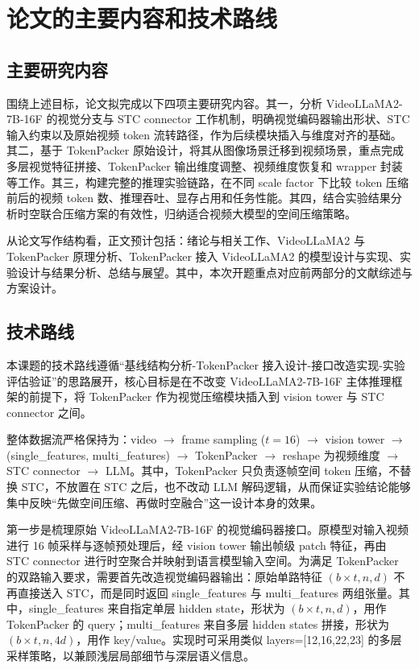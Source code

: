 \section{论文的主要内容和技术路线}

\subsection{主要研究内容}

围绕上述目标，论文拟完成以下四项主要研究内容。其一，分析 VideoLLaMA2-7B-16F 的视觉分支与 STC connector 工作机制，明确视觉编码器输出形状、STC 输入约束以及原始视频 token 流转路径，作为后续模块插入与维度对齐的基础。其二，基于 TokenPacker 原始设计，将其从图像场景迁移到视频场景，重点完成多层视觉特征拼接、TokenPacker 输出维度调整、视频维度恢复和 wrapper 封装等工作。其三，构建完整的推理实验链路，在不同 scale factor 下比较 token 压缩前后的视频 token 数、推理吞吐、显存占用和任务性能。其四，结合实验结果分析时空联合压缩方案的有效性，归纳适合视频大模型的空间压缩策略。

从论文写作结构看，正文预计包括：绪论与相关工作、VideoLLaMA2 与 TokenPacker 原理分析、TokenPacker 接入 VideoLLaMA2 的模型设计与实现、实验设计与结果分析、总结与展望。其中，本次开题重点对应前两部分的文献综述与方案设计。

\subsection{技术路线}

本课题的技术路线遵循“基线结构分析-TokenPacker 接入设计-接口改造实现-实验评估验证”的思路展开，核心目标是在不改变 VideoLLaMA2-7B-16F 主体推理框架的前提下，将 TokenPacker 作为视觉压缩模块插入到 vision tower 与 STC connector 之间\cite{tokenpacker2024,videollama22024}。

整体数据流严格保持为：video $\to$ frame sampling ($t=16$) $\to$ vision tower $\to$ (single\_features, multi\_features) $\to$ TokenPacker $\to$ reshape 为视频维度 $\to$ STC connector $\to$ LLM。其中，TokenPacker 只负责逐帧空间 token 压缩，不替换 STC，不放置在 STC 之后，也不改动 LLM 解码逻辑，从而保证实验结论能够集中反映“先做空间压缩、再做时空融合”这一设计本身的效果。

第一步是梳理原始 VideoLLaMA2-7B-16F 的视觉编码器接口。原模型对输入视频进行 16 帧采样与逐帧预处理后，经 vision tower 输出帧级 patch 特征，再由 STC connector 进行时空聚合并映射到语言模型输入空间\cite{videollama22024}。为满足 TokenPacker 的双路输入要求，需要首先改造视觉编码器输出：原始单路特征 $(b\times t,n,d)$ 不再直接送入 STC，而是同时返回 single\_features 与 multi\_features 两组张量。其中，single\_features 来自指定单层 hidden state，形状为 $(b\times t,n,d)$，用作 TokenPacker 的 query；multi\_features 来自多层 hidden states 拼接，形状为 $(b\times t,n,4d)$，用作 key/value。实现时可采用类似 layers=[12,16,22,23] 的多层采样策略，以兼顾浅层局部细节与深层语义信息。


